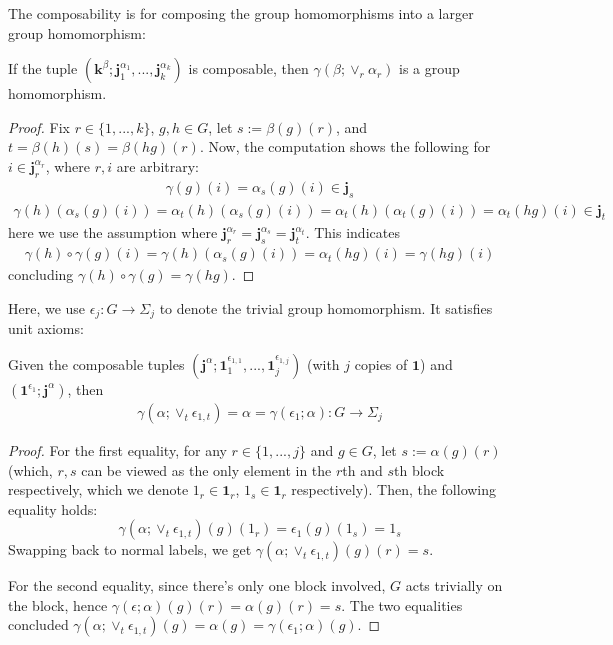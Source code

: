 \documentclass{article}
\begin{document}
\hfil

The composability is for composing the group homomorphisms into a larger group homomorphism:
\begin{prop}
    If the tuple $(\mathbf{k}^\beta;\mathbf{j}_1^{\alpha_1},...,\mathbf{j}_k^{\alpha_k})$ is composable, then $\gamma(\beta;\vee_r \alpha_r)$ is a group homomorphism.
\end{prop}
\begin{proof}
    Fix $r\in\{1,...,k\}$, $g,h\in G$, let $s:= \beta(g)(r)$, and $t = \beta(h)(s)=\beta(hg)(r)$. Now, the computation shows the following for $i\in \mathbf{j}_r^{\alpha_r}$, where $r,i$ are arbitrary:
    \begin{align*}
        \gamma(g)(i) = \alpha_s (g)(i) \in\mathbf{j}_s
    \end{align*}
    \begin{align*}
        \gamma(h)(\alpha_s(g)(i)) = \alpha_t(h)(\alpha_s(g)(i)) = \alpha_t (h)(\alpha_t(g)(i)) = \alpha_t(hg)(i)\in\mathbf{j}_t
    \end{align*}   
    here we use the assumption where $\mathbf{j}_r^{\alpha_r}=\mathbf{j}_s^{\alpha_s}=\mathbf{j}_t^{\alpha_t}$. This indicates 
    \begin{align*}
        \gamma(h)\circ \gamma(g)(i) = \gamma(h)(\alpha_s(g)(i)) = \alpha_t(hg)(i) = \gamma(hg)(i)
    \end{align*}
    concluding $\gamma(h)\circ \gamma(g)=\gamma(hg)$.
\end{proof}

\hfil

Here, we use $\epsilon_j:G\rightarrow \Sigma_j$ to denote the trivial group homomorphism. It satisfies unit axioms:
\begin{prop}
    Given the composable tuples $(\mathbf{j}^\alpha;\mathbf{1}_1^{\epsilon_{1,1}},...,\mathbf{1}_j^{\epsilon_{1,j}})$ (with $j$ copies of $\mathbf{1}$) and $(\mathbf{1}^{\epsilon_1};\mathbf{j}^\alpha)$, then
    \begin{align*}
        \gamma(\alpha;\vee_t\epsilon_{1,t}) = \alpha=\gamma(\epsilon_1;\alpha):G\rightarrow\Sigma_j
    \end{align*}
\end{prop}
\begin{proof}
    For the first equality, for any $r\in \{1,...,j\}$ and $g\in G$, let $s:= \alpha(g)(r)$ (which, $r,s$ can be viewed as the only element in the $r$th and $s$th block respectively, which we denote $1_r\in \mathbf{1}_r$, $1_s\in \mathbf{1}_r$ respectively). Then, the following equality holds:
    \[\gamma(\alpha;\vee_t\epsilon_{1,t})(g)(1_r) = \epsilon_1(g)(1_s) = 1_s\]
    Swapping back to normal labels, we get $\gamma(\alpha;\vee_t\epsilon_{1,t})(g)(r)=s$.

    \hfil

    For the second equality, since there's only one block involved, $G$ acts trivially on the block, hence $\gamma(\epsilon;\alpha)(g)(r) = \alpha(g)(r) = s$. The two equalities concluded $\gamma(\alpha;\vee_t\epsilon_{1,t})(g)=\alpha(g)=\gamma(\epsilon_1;\alpha)(g)$.
\end{proof}
\end{document}
